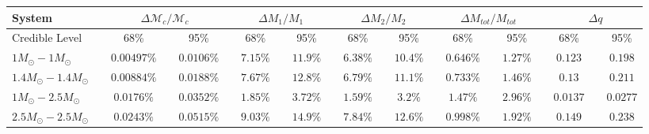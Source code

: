 \documentclass[11pt,a4paper]{emulateapj} 
\newcommand{\chmass}{\mathcal{M}_c}
\begin{document}
\begin{table}[t!]
{\begin{tabular}{lcccccccccccccccccccc}
 \hline\hline System & \vline & \multicolumn{3}{c}{$\Delta \chmass / \chmass$} &
\vline & \multicolumn{3}{c}{$\Delta M_1 / M_1$} & \vline & \multicolumn{3}{c}{$\Delta M_2 / M_2$} & \vline &
\multicolumn{3}{c}{$\Delta M_{tot}/M_{tot}$} & \vline & \multicolumn{3}{c}{$\Delta q$}\\ \hline
Credible Level & \vline & 68\% & \vline & 95\% & \vline & 68\% & \vline & 95\% & \vline & 68\% & \vline & 95\% & \vline & 68\% & \vline & 95\% & \vline & 68\% & \vline & 95\% \\
\hline\hline

$1M_{\odot}-1M_{\odot}$ & \vline &$0.00497\%$ & \vline &$0.0106\%$ & \vline & $7.15\%$ & \vline &$11.9\%$ & \vline & $6.38\%$ & \vline &$10.4\%$ & \vline & $0.646\%$ & \vline &$1.27\%$ & \vline & $0.123$ & \vline &$0.198$\\\hline$1.4M_{\odot}-1.4M_{\odot}$ & \vline &$0.00884\%$ & \vline &$0.0188\%$ & \vline & $7.67\%$ & \vline &$12.8\%$ & \vline & $6.79\%$ & \vline &$11.1\%$ & \vline & $0.733\%$ & \vline &$1.46\%$ & \vline & $0.13$ & \vline &$0.211$\\\hline$1M_{\odot}-2.5M_{\odot}$ & \vline &$0.0176\%$ & \vline &$0.0352\%$ & \vline & $1.85\%$ & \vline &$3.72\%$ & \vline & $1.59\%$ & \vline &$3.2\%$ & \vline & $1.47\%$ & \vline &$2.96\%$ & \vline & $0.0137$ & \vline &$0.0277$\\\hline$2.5M_{\odot}-2.5M_{\odot}$ & \vline &$0.0243\%$ & \vline &$0.0515\%$ & \vline & $9.03\%$ & \vline &$14.9\%$ & \vline & $7.84\%$ & \vline &$12.6\%$ & \vline & $0.998\%$ & \vline &$1.92\%$ & \vline & $0.149$ & \vline &$0.238$\\

\hline
\hline


\end{tabular}}
\label{ciTableIntrinsic}
\end{table}
\end{document}

